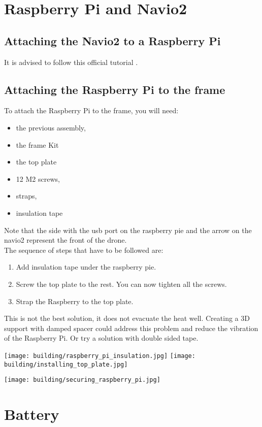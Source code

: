\section{Raspberry Pi and Navio2}
\subsection{Attaching the Navio2 to a Raspberry Pi}
It is advised to follow this official tutorial \cite{emlid_hardware_setup}.

\subsection{Attaching the Raspberry Pi to the frame}
To attach the Raspberry Pi to the frame, you will need:
\begin{itemize}
    \item the previous assembly,
    \item the frame Kit
    \item the top plate
    \item 12 M2 screws,
    \item straps,
    \item insulation tape
\end{itemize}
Note that the side with the usb port on the raspberry pie and the arrow on the navio2 represent the front of the drone.\\
The sequence of steps that have to be followed are:
\begin{enumerate}
    \item Add insulation tape under the raspberry pie.
    \item Screw the top plate to the rest. You can now tighten all the screws.
    \item Strap the Raspberry to the top plate.
\end{enumerate}

This is not the best solution, it does not evacuate the heat well. Creating a 3D support with damped spacer could address this problem and reduce the vibration of the Raspberry Pi. Or try a solution with double sided tape.

\texttt{[image: building/raspberry\_pi\_insulation.jpg]}
\texttt{[image: building/installing\_top\_plate.jpg]}

\texttt{[image: building/securing\_raspberry\_pi.jpg]}

\section{Battery}
